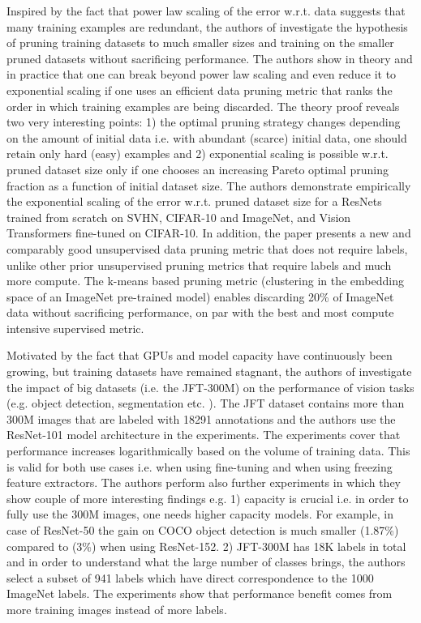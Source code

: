 \documentclass{article} %
\begin{document}
Inspired by the fact that power law scaling of the error w.r.t. data suggests that many training examples are redundant, the authors of \cite{sorscher2023neural} investigate the hypothesis of pruning training datasets to much smaller sizes and training on the smaller pruned datasets without sacrificing performance. The authors show in theory and in practice that one can break beyond power law scaling and even reduce it to exponential scaling if one uses an efficient data pruning metric that ranks the order in which training examples are being discarded. The theory proof reveals two very interesting points: 1) the optimal pruning strategy changes depending on the amount of initial data i.e. with abundant (scarce) initial data, one should retain only hard (easy) examples and 2) exponential scaling is possible w.r.t. pruned dataset size only if one chooses an increasing Pareto optimal pruning fraction as a function of initial dataset size. The authors demonstrate empirically the exponential scaling of the error w.r.t. pruned dataset size for a ResNets trained from scratch on SVHN, CIFAR-10 and ImageNet, and Vision Transformers fine-tuned on CIFAR-10. In addition, the paper presents a new and comparably good unsupervised data pruning metric that does not require labels, unlike other prior unsupervised pruning metrics that require labels and much more compute. The k-means based pruning metric (clustering in the embedding space of an ImageNet pre-trained model) enables discarding 20\% of ImageNet data without sacrificing performance, on par with the best and most compute intensive supervised metric.

Motivated by the fact that GPUs and model capacity have continuously been growing, but training datasets have remained stagnant, the authors of \cite{sun2017revisiting} investigate the impact of big datasets (i.e. the JFT-300M) on the performance of vision tasks (e.g. object detection, segmentation etc. ). The JFT dataset contains more than 300M images that are labeled with 18291 annotations and the authors use the ResNet-101 model architecture in the experiments. The experiments cover that performance increases logarithmically based on the volume of training data. This is valid for both use cases i.e. when using fine-tuning and when using freezing feature extractors. The authors perform also further experiments in which they show couple of more interesting findings e.g. 1) capacity is crucial i.e. in order to fully use the 300M images, one needs higher capacity models. For example, in case of ResNet-50 the gain on COCO object detection is much smaller (1.87\%) compared to (3\%) when using ResNet-152. 2) JFT-300M has 18K labels in total and in order to understand what the large number of classes brings, the authors select a subset of 941 labels which have direct correspondence to the 1000 ImageNet labels. The experiments show that performance benefit comes from more training images instead of more labels.
\end{document}
